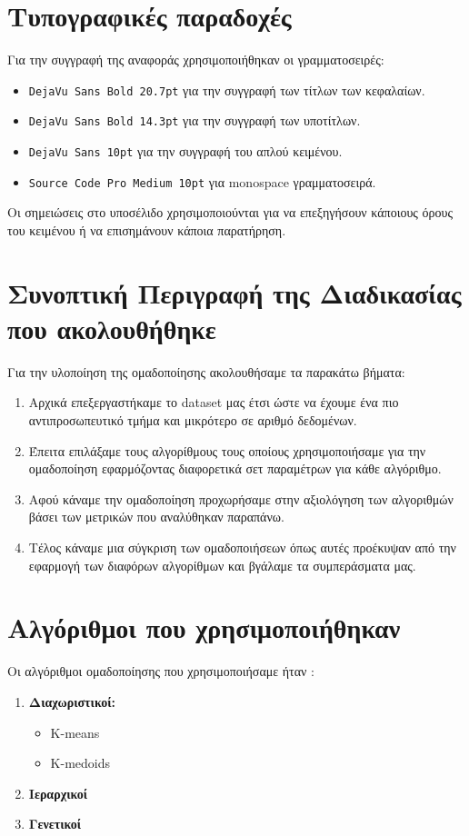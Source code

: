 \section{Τυπογραφικές παραδοχές}
Για την συγγραφή της αναφοράς χρησιμοποιήθηκαν οι γραμματοσειρές:
\begin{itemize}
\item \texttt{DejaVu Sans Bold 20.7pt} για την συγγραφή των τίτλων των κεφαλαίων.

\item \texttt{DejaVu Sans Bold 14.3pt} για την συγγραφή των υποτίτλων.

\item \texttt{DejaVu Sans 10pt} για την συγγραφή του απλού κειμένου.

\item \texttt{Source Code Pro Medium 10pt} για monospace γραμματοσειρά.
\end{itemize}

Οι σημειώσεις στο υποσέλιδο χρησιμοποιούνται για να επεξηγήσουν κάποιους όρους του κειμένου
ή να επισημάνουν κάποια παρατήρηση.

\section{Συνοπτική Περιγραφή της Διαδικασίας που ακολουθήθηκε}
Για την υλοποίηση της ομαδοποίησης ακολουθήσαμε τα παρακάτω βήματα:
\begin{enumerate}
	\item Αρχικά επεξεργαστήκαμε το dataset μας έτσι ώστε να έχουμε ένα πιο αντιπροσωπευτικό τμήμα και μικρότερο σε αριθμό δεδομένων. 
	\item Έπειτα επιλάξαμε τους αλγορίθμους τους οποίους χρησιμοποιήσαμε για την ομαδοποίηση εφαρμόζοντας διαφορετικά σετ παραμέτρων για κάθε αλγόριθμο.
	\item Αφού κάναμε την ομαδοποίηση προχωρήσαμε στην αξιολόγηση των αλγοριθμών βάσει των μετρικών που αναλύθηκαν παραπάνω.
	\item Τέλος κάναμε μια σύγκριση των ομαδοποιήσεων όπως αυτές προέκυψαν από την εφαρμογή των διαφόρων αλγορίθμων και βγάλαμε τα συμπεράσματα μας.
\end{enumerate}

\section{Αλγόριθμοι που χρησιμοποιήθηκαν}
Οι αλγόριθμοι ομαδοποίησης που χρησιμοποιήσαμε ήταν :
\begin{enumerate}
	\item \textbf{Διαχωριστικοί:}
	\begin{itemize}
		\item K-means
		\item K-medoids
	\end{itemize}  
	\item \textbf{Ιεραρχικοί}
	\item \textbf{Γενετικοί}  
\end{enumerate}

